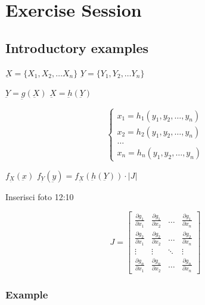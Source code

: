 \setchapterabstract{}
\chapter{Exercise Session}
\vspace{-1.5cm}

{\chaptoc\noindent\begin{minipage}[inner sep=0,outer sep=0]{0.9\linewidth}\section{Introductory examples}\end{minipage}}

\( \underbar{X} = \{ X_1, X_2, \ldots X_n \} \)
\( \underbar{Y} = \{ Y_1, Y_2, \ldots Y_n \} \)

\( \underbar{Y} = \underbar{g}(\underbar{X}) \)
\( \underbar{X} = \underbar{h}(\underbar{Y}) \)

\begin{equation}
    \begin{cases}
        x_1 = h_1(y_1, y_2, \ldots, y_n) \\
        x_2 = h_2(y_1, y_2, \ldots, y_n) \\
        \ldots \\
        x_n = h_n(y_1, y_2, \ldots, y_n)
    \end{cases}
\end{equation}

\(f_{\underbar{X}} (\underbar{x})\)
\( f_{\underbar{Y}} (\underbar{y}) = f_{\underbar{X}} (\underbar{h}(\underbar{Y})) \cdot |J| \)

Inserisci foto 12:10

\[
J = \begin{bmatrix}
\frac{{\partial g_1}}{{\partial x_1}} & \frac{{\partial g_1}}{{\partial x_2}} & \ldots & \frac{{\partial g_1}}{{\partial x_n}} \\
\frac{{\partial g_2}}{{\partial x_1}} & \frac{{\partial g_2}}{{\partial x_2}} & \ldots & \frac{{\partial g_2}}{{\partial x_n}} \\
\vdots & \vdots & \ddots & \vdots \\
\frac{{\partial g_n}}{{\partial x_1}} & \frac{{\partial g_n}}{{\partial x_2}} & \ldots & \frac{{\partial g_n}}{{\partial x_n}}
\end{bmatrix}
\]

\subsection{Example}

